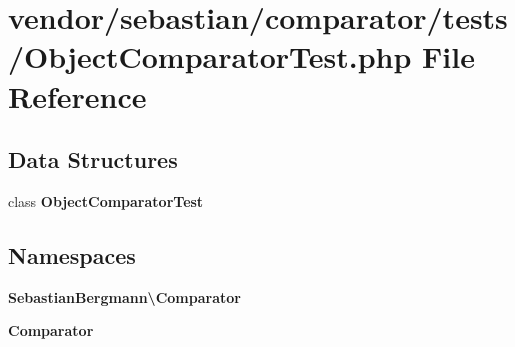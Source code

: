 \section{vendor/sebastian/comparator/tests/\+Object\+Comparator\+Test.php File Reference}
\label{_object_comparator_test_8php}
\subsection*{Data Structures}
\begin{DoxyCompactItemize}
\item 
class {\bf Object\+Comparator\+Test}
\end{DoxyCompactItemize}
\subsection*{Namespaces}
\begin{DoxyCompactItemize}
\item 
 {\bf Sebastian\+Bergmann\textbackslash{}\+Comparator}
\item 
 {\bf Comparator}
\end{DoxyCompactItemize}
